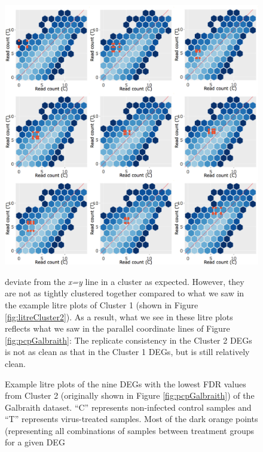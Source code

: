 \documentclass[11pt,a4paper,oldfontcommands,openany]{memoir}
\numberwithin{equation}{section} %
\begin{document}
\begin{figure}[H]
  \includegraphics[width=\textwidth]{Images/litreCluster1}
  \caption{Example litre plots of the nine DEGs with the lowest FDR values from Cluster 2 (originally shown in Figure \ref{fig:pcpGalbraith}) of the Galbraith dataset. ``C'' represents non-infected control samples and ``T'' represents virus-treated samples. Most of the dark orange points (representing all combinations of samples between treatment groups for a given DEG} deviate from the \textit{x=y} line in a cluster as expected. However, they are not as tightly clustered together compared to what we saw in the example litre plots of Cluster 1 (shown in Figure \ref{fig:litreCluster2}). As a result, what we see in these litre plots reflects what we saw in the parallel coordinate lines of Figure \ref{fig:pcpGalbraith}: The replicate consistency in the Cluster 2 DEGs is not as clean as that in the Cluster 1 DEGs, but is still relatively clean.
  \label{fig:litreCluster1}
\end{figure}
\end{document}
